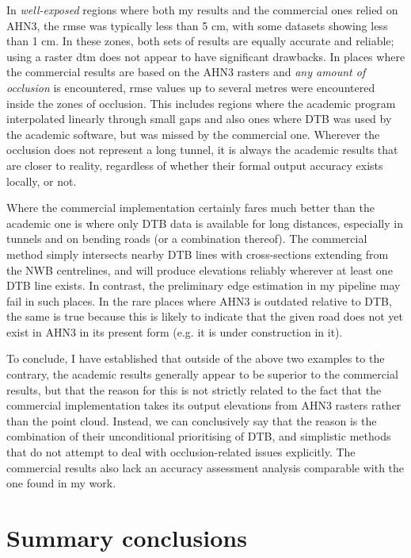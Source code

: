 In \textit{well-exposed} regions where both my results and the commercial ones relied on AHN3, the \ac{rmse} was typically less than 5 cm, with some datasets showing less than 1 cm. In these zones, both sets of results are equally accurate and reliable; using a raster \ac{dtm} does not appear to have significant drawbacks. In places where the commercial results are based on the AHN3 rasters and \textit{any amount of occlusion} is encountered, \ac{rmse} values up to several metres were encountered inside the zones of occlusion. This includes regions where the academic program interpolated linearly through small gaps and also ones where DTB was used by the academic software, but was missed by the commercial one. Wherever the occlusion does not represent a long tunnel, it is always the academic results that are closer to reality, regardless of whether their formal output accuracy exists locally, or not.

Where the commercial implementation certainly fares much better than the academic one is where only DTB data is available for long distances, especially in tunnels and on bending roads (or a combination thereof). The commercial method simply intersects nearby DTB lines with cross-sections extending from the NWB centrelines, and will produce elevations reliably wherever at least one DTB line exists. In contrast, the preliminary edge estimation in my pipeline may fail in such places. In the rare places where AHN3 is outdated relative to DTB, the same is true because this is likely to indicate that the given road does not yet exist in AHN3 in its present form (e.g. it is under construction in it).

To conclude, I have established that outside of the above two examples to the contrary, the academic results generally appear to be superior to the commercial results, but that the reason for this is not strictly related to the fact that the commercial implementation takes its output elevations from AHN3 rasters rather than the point cloud. Instead, we can conclusively say that the reason is the combination of their unconditional prioritising of DTB, and simplistic methods that do not attempt to deal with occlusion-related issues explicitly. The commercial results also lack an accuracy assessment analysis comparable with the one found in my work.

\section{Summary conclusions}
\label{sec:conclusions}

